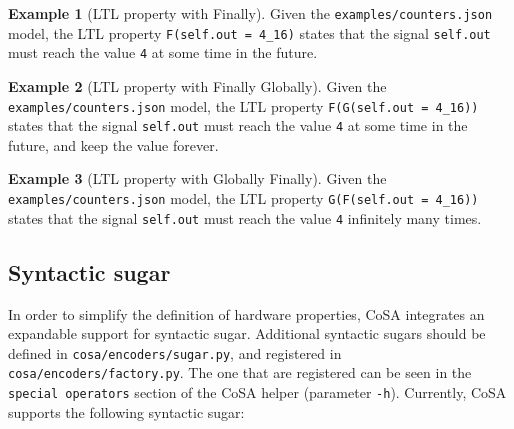 \documentclass{article}
\theoremstyle{definition}
\newtheorem{example}{Example}[section]
\begin{document}
\begin{example}[LTL property with Finally]
  Given the \texttt{examples/counters.json} model, the LTL property
  \texttt{F(self.out = 4\_16)} states that the signal
  \texttt{self.out} must reach the value \texttt{4} at some time in
  the future.
\end{example}

\begin{example}[LTL property with Finally Globally]
  Given the \texttt{examples/counters.json} model, the LTL property
  \texttt{F(G(self.out = 4\_16))} states that the signal
  \texttt{self.out} must reach the value \texttt{4} at some time in
  the future, and keep the value forever.
\end{example}

\begin{example}[LTL property with Globally Finally]
  Given the \texttt{examples/counters.json} model, the LTL property
  \texttt{G(F(self.out = 4\_16))} states that the signal
  \texttt{self.out} must reach the value \texttt{4} infinitely many
  times.
\end{example}


\subsection{Syntactic sugar}

In order to simplify the definition of hardware properties, CoSA
integrates an expandable support for syntactic sugar. Additional
syntactic sugars should be defined in \texttt{cosa/encoders/sugar.py},
and registered in \texttt{cosa/encoders/factory.py}. The one that are
registered can be seen in the \texttt{special operators} section of
the CoSA helper (parameter \texttt{-h}). Currently, CoSA supports the
following syntactic sugar:
\end{document}
